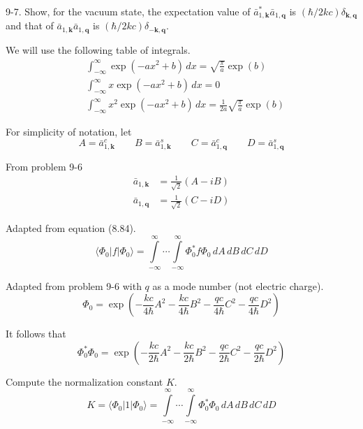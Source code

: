 \documentclass[12pt]{article}
\begin{document}
9-7.
Show, for the vacuum state, the expectation value
of $\bar a_{1,\mathbf k}^*\bar a_{1,\mathbf q}$
is $(\hbar/2kc)\delta_{\mathbf k,\mathbf q}$ and that
of $\bar a_{1,\mathbf k}\bar a_{1,\mathbf q}$
is $(\hbar/2kc)\delta_{-\mathbf k,\mathbf q}$.

\bigskip
We will use the following table of integrals.
\begin{align*}
&\int_{-\infty}^\infty\exp(-ax^2+b)\,dx=\sqrt{\frac{\pi}{a}}\exp(b)
\tag{1}
\\
&\int_{-\infty}^\infty x\exp(-ax^2+b)\,dx=0
\tag{2}
\\
&\int_{-\infty}^\infty x^2\exp(-ax^2+b)\,dx=\frac{1}{2a}\sqrt{\frac{\pi}{a}}\exp(b)
\tag{3}
\end{align*}

For simplicity of notation, let
\begin{equation*}
A=\bar a_{1,\mathbf k}^c
\qquad
B=\bar a_{1,\mathbf k}^s
\qquad
C=\bar a_{1,\mathbf q}^c
\qquad
D=\bar a_{1,\mathbf q}^s
\end{equation*}

From problem 9-6
\begin{equation*}
\begin{aligned}
\bar a_{1,\mathbf k}&=\frac{1}{\sqrt2}(A-iB)
\\
\bar a_{1,\mathbf q}&=\frac{1}{\sqrt2}(C-iD)
\end{aligned}
\tag{4}
\end{equation*}

Adapted from equation (8.84).
\begin{equation*}
\langle\Phi_0|f|\Phi_0\rangle
=\int\limits_{-\infty}^\infty\cdots\int\limits_{-\infty}^\infty
\Phi_0^*f\Phi_0
\,dA\,dB\,dC\,dD
\end{equation*}

Adapted from problem 9-6 with $q$ as a mode number (not electric charge).
\begin{equation*}
\Phi_0=\exp\left(
-\frac{kc}{4\hbar}A^2
-\frac{kc}{4\hbar}B^2
-\frac{qc}{4\hbar}C^2
-\frac{qc}{4\hbar}D^2
\right)
\end{equation*}

It follows that
\begin{equation*}
\Phi_0^*\Phi_0=\exp\left(
-\frac{kc}{2\hbar}A^2
-\frac{kc}{2\hbar}B^2
-\frac{qc}{2\hbar}C^2
-\frac{qc}{2\hbar}D^2
\right)
\end{equation*}

Compute the normalization constant $K$.
\begin{equation*}
K=\langle\Phi_0|1|\Phi_0\rangle
=\int\limits_{-\infty}^\infty\cdots\int\limits_{-\infty}^\infty
\Phi_0^*\Phi_0
\,dA\,dB\,dC\,dD
\end{equation*}
\end{document}
